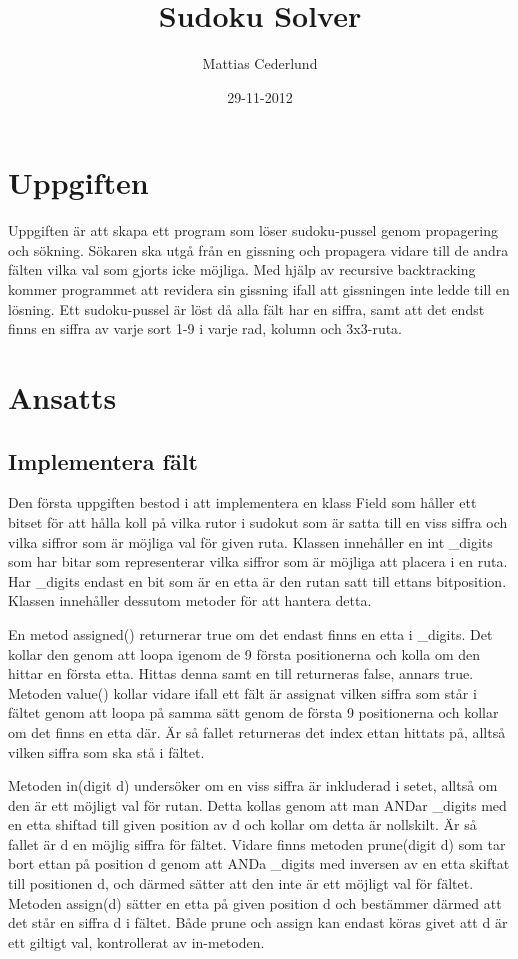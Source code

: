 \documentclass[a4paper, 11pt]{article}
\title{Sudoku Solver}
\author{Mattias Cederlund}
\date{29-11-2012}
\begin{document}
\maketitle 

\section{Uppgiften}

Uppgiften är att skapa ett program som löser sudoku-pussel genom propagering och sökning. Sökaren ska utgå från en gissning och propagera vidare till de andra fälten vilka val som gjorts icke möjliga. Med hjälp av recursive backtracking kommer programmet att revidera sin gissning ifall att gissningen inte ledde till en lösning. Ett sudoku-pussel är löst då alla fält har en siffra, samt att det endst finns en siffra av varje sort 1-9 i varje rad, kolumn och 3x3-ruta.

\section{Ansatts}

\subsection{Implementera fält}

Den första uppgiften bestod i att implementera en klass Field som håller ett bitset för att hålla koll på vilka rutor i sudokut som är satta till en viss siffra och vilka siffror som är möjliga val för given ruta. Klassen innehåller en int \_digits som har bitar som representerar vilka siffror som är möjliga att placera i en ruta. Har \_digits endast en bit som är en etta är den rutan satt till ettans bitposition. Klassen innehåller dessutom metoder för att hantera detta.

 En metod assigned() returnerar true om det endast finns en etta i \_digits. Det kollar den genom att loopa igenom de 9 första positionerna och kolla om den hittar en första etta. Hittas denna samt en till returneras false, annars true. Metoden value() kollar vidare ifall ett fält är assignat vilken siffra som står i fältet genom att loopa på samma sätt genom de första 9 positionerna och kollar om det finns en etta där. Är så fallet returneras det index ettan hittats på, alltså vilken siffra som ska stå i fältet.

Metoden in(digit d) undersöker om en viss siffra är inkluderad i setet, alltså om den är ett möjligt val för rutan. Detta kollas genom att man ANDar \_digits med en etta shiftad till given position av d och kollar om detta är nollskilt. Är så fallet är d en möjlig siffra för fältet. Vidare finns metoden prune(digit d) som tar bort ettan på position d genom att ANDa \_digits med inversen av en etta skiftat till positionen d, och därmed sätter att den inte är ett möjligt val för fältet. Metoden assign(d) sätter en etta på given position d och bestämmer därmed att det står en siffra d i fältet. Både prune och assign kan endast köras givet att d är ett giltigt val, kontrollerat av in-metoden.
\end{document}
